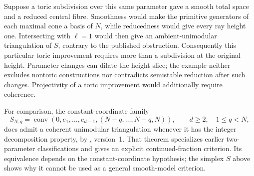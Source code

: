 \begin{example}
Suppose a toric subdivision over this same parameter gave a smooth
total space and a reduced central fibre. Smoothness would make the
primitive generators of each maximal cone a basis of $N$, while
reducedness would give every ray height one. Intersecting with
$\ell=1$ would then give an ambient-unimodular triangulation of
$S$, contrary to the published obstruction. Consequently this
particular toric improvement requires more than a subdivision at
the original height. Parameter changes can dilate the height slice;
the example neither excludes nontoric constructions nor contradicts
semistable reduction after such changes. Projectivity of a toric
improvement would additionally require coherence.

For comparison, the constant-coordinate family
\[
 S_{N,q}=\operatorname{conv}
  (0,e_1,\ldots,e_{d-1},(N-q,\ldots,N-q,N)),
 \qquad d\ge2,\quad 1\le q<N,
\]
does admit a coherent unimodular triangulation whenever it has
the integer decomposition property, by
\cite[Theorem~1.4]{LTTZ26HNF}, version~1. That theorem specializes
earlier two-parameter classifications and gives an explicit
continued-fraction criterion. Its equivalence depends on the
constant-coordinate hypothesis; the simplex $S$ above shows why
it cannot be used as a general smooth-model criterion.
\end{example}

